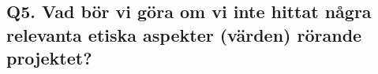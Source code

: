 \subsection{Q5. Vad bör vi göra om vi inte hittat några relevanta etiska aspekter (värden) rörande projektet?}


